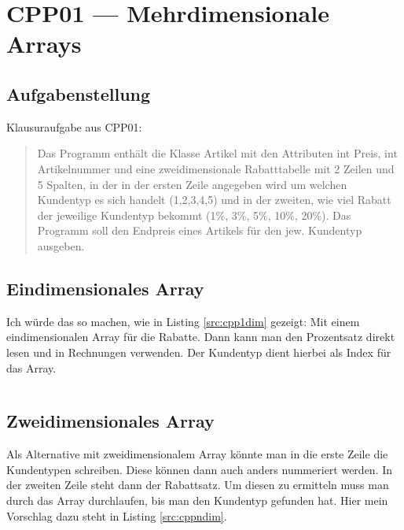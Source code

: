 \section{CPP01 --- Mehrdimensionale Arrays}
\label{sec:cpp01}

\subsection{Aufgabenstellung}
Klausuraufgabe aus CPP01:

\begin{quote}
Das Programm enthält die Klasse Artikel mit den Attributen int Preis, int Artikelnummer und eine zweidimensionale Rabatttabelle mit 2 Zeilen und 5 Spalten, in der in der ersten Zeile angegeben wird um welchen Kundentyp es sich handelt (1,2,3,4,5) und in der zweiten, wie viel Rabatt der jeweilige Kundentyp bekommt (1\%, 3\%, 5\%, 10\%, 20\%). Das Programm soll den Endpreis eines Artikels für den jew. Kundentyp ausgeben. 
\end{quote}

\subsection{Eindimensionales Array}

Ich würde das so machen, wie in Listing \ref{src:cpp1dim} gezeigt: Mit einem eindimensionalen Array für die Rabatte. Dann kann man den Prozentsatz direkt lesen und in Rechnungen verwenden. Der Kundentyp dient hierbei als Index für das Array.

\begin{singlespacing}
\inputminted[linenos]{c++}{cpp1dim.cpp}
\end{singlespacing}

\subsection{Zweidimensionales Array}

Als Alternative mit zweidimensionalem Array könnte man in die erste Zeile die Kundentypen schreiben. Diese können dann auch anders nummeriert werden. In der zweiten Zeile steht dann der Rabattsatz. Um diesen zu ermitteln muss man durch das Array durchlaufen, bis man den Kundentyp gefunden hat. Hier mein Vorschlag dazu steht in Listing \ref{src:cppndim}.

\begin{singlespacing}
\inputminted[linenos]{c++}{cpp1dim.cpp}
\end{singlespacing}
